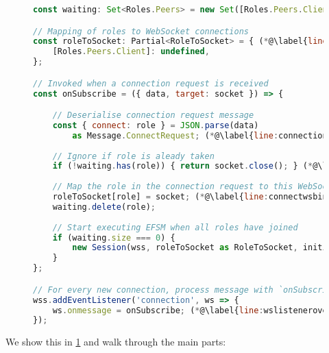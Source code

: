\begin{figure}[!h]
\begin{lstlisting}[language=javascript,tabsize=2]
const waiting: Set<Roles.Peers> = new Set([Roles.Peers.Client]); (*@\label{line:initwaiting}@*)

// Mapping of roles to WebSocket connections
const roleToSocket: Partial<RoleToSocket> = { (*@\label{line:initroletosocket}@*)
	[Roles.Peers.Client]: undefined,
};

// Invoked when a connection request is received
const onSubscribe = ({ data, target: socket }) => {

	// Deserialise connection request message
	const { connect: role } = JSON.parse(data) 
		as Message.ConnectRequest; (*@\label{line:connectionrequest}@*)
		
	// Ignore if role is aleady taken
	if (!waiting.has(role)) { return socket.close(); } (*@\label{line:occupied}@*)
	
	// Map the role in the connection request to this WebSocket
	roleToSocket[role] = socket; (*@\label{line:connectwsbind}@*)
	waiting.delete(role);
	
	// Start executing EFSM when all roles have joined
	if (waiting.size === 0) {
		new Session(wss, roleToSocket as RoleToSocket, initialState); (*@\label{line:newsession}@*)
	}
};

// For every new connection, process message with `onSubscribe`
wss.addEventListener('connection', ws => {
	ws.onmessage = onSubscribe; (*@\label{line:wslisteneroverride}@*)
});
\end{lstlisting}
\label{lst:nodeconnect}
\end{figure}

We show this in \cref{lst:nodeconnect} and walk through
the main parts:

